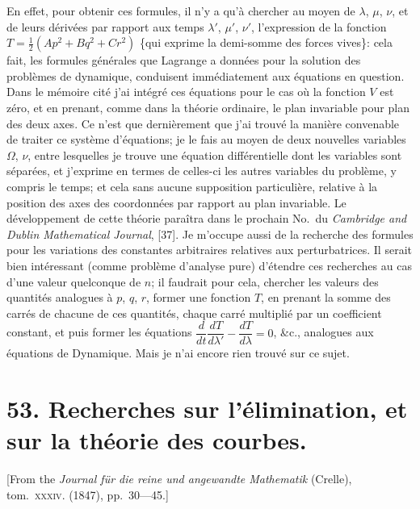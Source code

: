 \documentclass[11pt,a4paper]{book}
\begin{document}
En effet, pour obtenir ces formules, il n'y a qu'\`a chercher au moyen de $\lambda$, $\mu$, $\nu$, et de leurs d\'eriv\'ees par rapport aux temps $\lambda'$, $\mu'$, $\nu'$, l'expression de la fonction $T = \tfrac{1}{2}(Ap^2 + Bq^2 + Cr^2)$ \{qui exprime la demi-somme des forces vives\}: cela fait, les formules g\'en\'erales que Lagrange a donn\'ees pour la solution des probl\`emes de dynamique, conduisent imm\'ediatement aux \'equations en question. Dans le m\'emoire cit\'e j'ai int\'egr\'e ces \'equations pour le cas o\`u la fonction $V$ est z\'ero, et en prenant, comme dans la th\'eorie ordinaire, le plan invariable pour plan des deux axes. Ce n'est que derni\`erement que j'ai trouv\'e la mani\`ere convenable de traiter ce syst\`eme d'\'equations; je le fais au moyen de deux nouvelles variables $\Omega$, $\nu$, entre lesquelles je trouve une \'equation diff\'erentielle dont les variables sont s\'epar\'ees, et j'exprime en termes de celles-ci les autres variables du probl\`eme, y compris le temps; et cela sans aucune supposition particuli\`ere, relative \`a la position des axes des coordonn\'ees par rapport au plan invariable. Le d\'eveloppement de cette th\'eorie para\^itra dans le prochain No.\ du \textit{Cambridge and Dublin Mathematical Journal}, [37]. Je m'occupe aussi de la recherche des formules pour les variations des constantes arbitraires relatives aux perturbatrices. Il serait bien int\'eressant (comme probl\`eme d'analyse pure) d'\'etendre ces recherches au cas d'une valeur quelconque de $n$; il faudrait pour cela, chercher les valeurs des quantit\'es analogues \`a $p$, $q$, $r$, former une fonction $T$, en prenant la somme des carr\'es de chacune de ces quantit\'es, chaque carr\'e multipli\'e par un coefficient constant, et puis former les \'equations $\dfrac{d}{dt} \dfrac{dT}{d\lambda'} - \dfrac{dT}{d\lambda} = 0$, \&c., analogues aux \'equations de Dynamique. Mais je n'ai encore rien trouv\'e sur ce sujet.

\newpage


\section*{53. Recherches sur l'\'elimination, et sur la th\'eorie des courbes.}

[From the \textit{Journal f\"ur die reine und angewandte Mathematik} (Crelle), tom.~\textsc{xxxiv}. (1847), pp.~30---45.]

\bigskip
\end{document}

